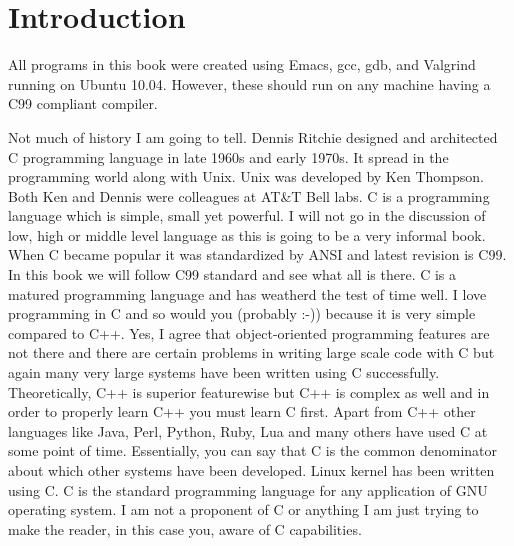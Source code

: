


\chapter{Introduction}
\startcolumns[n=3,distance=2em]
  \placelist
    [section]
    [alternative=c, %
     interaction=all,]
\stopcolumns
All programs in this book were created using Emacs, gcc, gdb, and
Valgrind  running on Ubuntu 10.04. However, these
should run on any machine having a C99 compliant compiler.

Not much of history I am going to tell. Dennis Ritchie designed and architected
C programming language in late 1960s and early 1970s. It spread in the
programming world along with Unix. Unix was developed by Ken Thompson. Both Ken
and Dennis were colleagues at AT\&T Bell labs. C is a programming language which
is simple, small yet powerful. I will not go in the discussion of low, high or
middle level language as this is going to be a very informal book. When C
became popular it was standardized by ANSI and latest revision is C99. In this
book we will follow C99 standard and see what all is there. C is a matured
programming language and has weatherd the test of time well. I love programming
in C and so would you (probably :-)) because it is very simple compared to C++.
Yes, I agree that object-oriented programming features are not there and there
are certain problems in writing large scale code with C but again many very
large systems have been written using C successfully.
Theoretically, C++ is superior featurewise but C++ is complex as well and in
order to properly learn C++ you must learn C first. Apart from C++ other
languages like Java, Perl, Python, Ruby, Lua and many others have used C at some
point of time. Essentially, you can say that C is the common denominator about
which other systems have been developed. Linux kernel has been written using C.
C is the standard programming language for any application of GNU operating
system. I am not a proponent of C or anything I am just trying to make the
reader, in this case you, aware of C capabilities.

